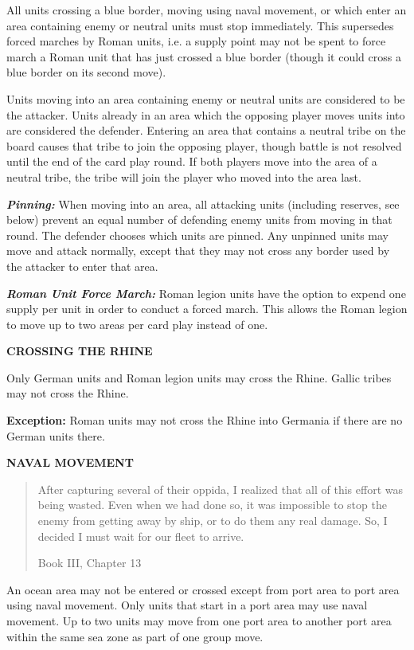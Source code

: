 All units crossing a blue border, moving using naval movement, or which enter an area containing enemy or neutral units must stop immediately. This supersedes forced marches by Roman units, i.e. a supply point may not be spent to force march a Roman unit that has just crossed a blue border (though it could cross a blue border on its second move).

Units moving into an area containing enemy or neutral units are considered to be the attacker. Units already in an area which the opposing player moves units into are considered the defender. Entering an area that contains a neutral tribe on the board causes that tribe to join the opposing player, though battle is not resolved until the end of the card play round. If both players move into the area of a neutral tribe, the tribe will join the player who moved into the area last.

\textit{\textbf{Pinning:}} When moving into an area, all attacking units (including reserves, see below) prevent an equal number of defending enemy units from moving in that round. The defender chooses which units are pinned. Any unpinned units may move and attack normally, except that they may not cross any border used by the attacker to enter that area.

\textit{\textbf{Roman Unit Force March:}} Roman legion units have the option to expend one supply per unit in order to conduct a forced march. This allows the Roman legion to move up to two areas per card play instead of one.

\textbf{CROSSING THE RHINE}
\par
Only German units and Roman legion units may cross the Rhine. Gallic tribes may not cross the Rhine.

\textbf{Exception:} Roman units may not cross the Rhine into Germania if there are no German units there.

\textbf{NAVAL MOVEMENT}
\blockquote[Book III, Chapter 13]{After capturing several of their oppida, I realized that all of this effort was being wasted. Even when we had done so, it was impossible to stop the enemy from getting away by ship, or to do them any real damage. So, I decided I must wait for our fleet to arrive.}
\par
An ocean area may not be entered or crossed except from port area to port area using naval movement. Only units that start in a port area may use naval movement. Up to two units may move from one port area to another port area within the same sea zone as part of one group move.

